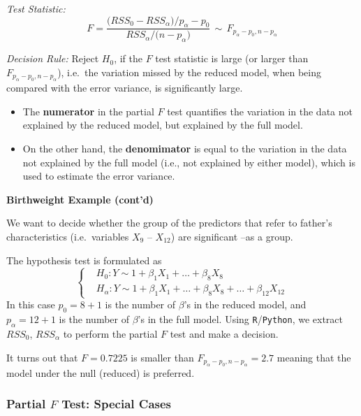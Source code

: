 \documentclass[
]{book}
\begin{document}
\emph{Test Statistic:}
\[F=\frac{\bigl(RSS_0 - RSS_{\alpha}\bigr)/p_{\alpha} - p_0}{RSS_{\alpha}/ \bigl(n-p_{\alpha} \bigr)}\,  \sim \, F_{p_{\alpha} - p_0, n-p_{\alpha}}\]

\emph{Decision Rule:}
Reject \(H_0\), if the \(F\) test statistic is large (or larger than \(F_{p_{\alpha} - p_0, n-p_{\alpha}}\)), i.e.~the variation missed by the reduced model, when being compared with the error variance, is significantly large.

\begin{itemize}
\item
  The \textbf{numerator} in the partial \(F\) test quantifies the variation in the data not explained by the reduced model, but explained by the full model.
\item
  On the other hand, the \textbf{denomimator} is equal to the variation in the data not explained by the full model (i.e., not explained by either model), which is used to estimate the error variance.
\end{itemize}

\textbf{Birthweight Example (cont'd)}

We want to decide whether the group of the predictors that refer to father's characteristics (i.e.~variables \(X_9\) -- \(X_{12}\)) are significant --as a group.

The hypothesis test is formulated as
\[\begin{cases}
 &H_0: Y \sim  1+  \beta_{1} X_{1} + \ldots + \beta_{8}X_{8} \\
 & H_{\alpha}:  Y \sim  1+  \beta_1 X_1 + \ldots + \beta_{8}X_{8}+ \ldots + \beta_{12} X_{12} 
 \end{cases} 
 \]
In this case \(p_0 = 8+1\) is the number of \(\beta\)'s in the reduced model, and \(p_{\alpha}=12+1\) is the number of \(\beta\)'s in the full model. Using \texttt{R}/\texttt{Python}, we extract \(RSS_0\), \(RSS_{\alpha}\) to perform the partial \(F\) test and make a decision.

It turns out that \(F = 0.7225\) is smaller than \(F_{p_{\alpha} - p_0, n-p_{\alpha}}=2.7\) meaning that the model under the null (reduced) is preferred.

\subsubsection*{\texorpdfstring{Partial \(F\) Test: Special Cases }{Partial F Test: Special Cases }}\label{partial-f-test-special-cases}
\end{document}
